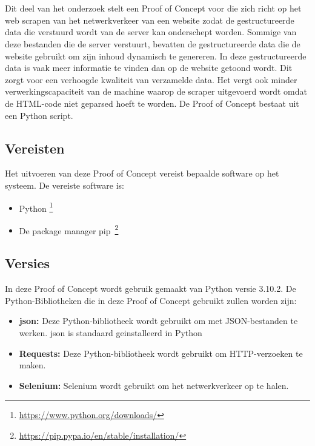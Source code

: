 \chapter{}%
\label{ch:proof-of-concept}

Dit deel van het onderzoek stelt een Proof of Concept voor die zich richt op het web scrapen van het netwerkverkeer van een website zodat de gestructureerde data die verstuurd wordt van de server kan onderschept worden. Sommige van deze bestanden die de server verstuurt, bevatten de gestructureerde data die de website gebruikt om zijn inhoud dynamisch te genereren. In deze gestructureerde data is vaak meer informatie te vinden dan op de website getoond wordt. Dit zorgt voor een verhoogde kwaliteit van verzamelde data. Het vergt ook minder verwerkingscapaciteit van de machine waarop de scraper uitgevoerd wordt omdat de HTML-code niet geparsed hoeft te worden. De Proof of Concept bestaat uit een Python script.

\section{Vereisten}
Het uitvoeren van deze Proof of Concept vereist bepaalde software op het systeem. De vereiste software is:
\begin{itemize}
    \item Python \footnote{\url{https://www.python.org/downloads/}}
    \item De package manager pip~\footnote{\url{https://pip.pypa.io/en/stable/installation/}}
\end{itemize}

\section{Versies}
In deze Proof of Concept wordt gebruik gemaakt van Python versie 3.10.2. De Python-Bibliotheken die in deze Proof of Concept gebruikt zullen worden zijn:

\begin{itemize}
    \item \textbf{json: } Deze Python-bibliotheek wordt gebruikt om met JSON-bestanden te werken. json is standaard geinstalleerd in Python

    \item \textbf{Requests: } Deze Python-bibliotheek wordt gebruikt om HTTP-verzoeken te maken.

    \item \textbf{Selenium: } Selenium wordt gebruikt om het netwerkverkeer op te halen.
\end{itemize}

